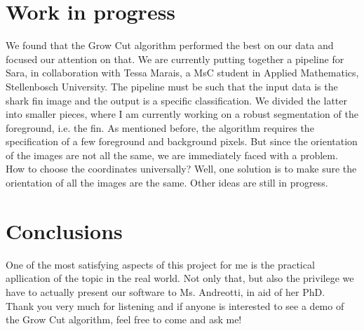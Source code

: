 \documentclass[a4paper,10pt]{article}
\begin{document}
\section{Work in progress}
We found that the Grow Cut algorithm performed the best on our data and focused our attention on that.  We are currently putting together a pipeline for Sara, in collaboration with Tessa Marais, a MsC student in Applied Mathematics, Stellenbosch University. The pipeline must be such that the input data is the shark fin image and the output is a specific classification. We divided the latter into smaller pieces, where I am currently working on a robust segmentation of the foreground, i.e. the fin.  As mentioned before, the algorithm requires the specification of a few foreground and background pixels.  But since the orientation of the images are not all the same, we are immediately faced with a problem. How to choose the coordinates universally?  Well, one solution is to make sure the orientation of all the images are the same.
Other ideas are still in progress.

\section{Conclusions}
One of the most satisfying aspects of this project for me is the practical apllication of the topic in the real world.  Not only that, but also the privilege we have to actually present our software to Ms. Andreotti, in aid of her PhD.   \\

Thank you very much for listening and if anyone is interested to see a demo of the Grow Cut algorithm, feel free to come and ask me!
\end{document}
